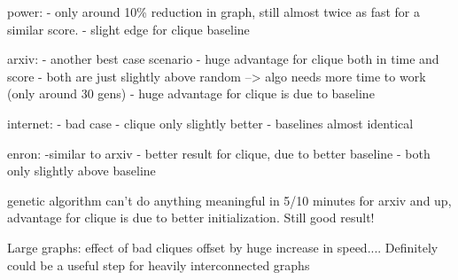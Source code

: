 power:
- only around 10\% reduction in graph, still almost twice as fast for a similar score.
- slight edge for clique baseline

arxiv:
- another best case scenario
- huge advantage for clique both in time and score
- both are just slightly above random --> algo needs more time to work (only around 30 gens)
- huge advantage for clique is due to baseline

internet:
- bad case
- clique only slightly better
- baselines almost identical

enron:
-similar to arxiv
- better result for clique, due to better baseline
- both only slightly above baseline

genetic algorithm can't do anything meaningful in 5/10 minutes for arxiv and up, advantage for clique is due to better initialization. Still good result!

Large graphs: effect of bad cliques offset by huge increase in speed.... Definitely could be a useful step for heavily interconnected graphs


